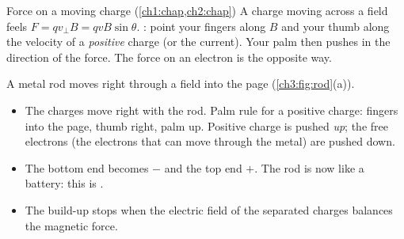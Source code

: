 \begin{keywords}
\end{keywords}

\begin{refresher}{Force on a moving charge (\cref{ch1:chap,ch2:chap})}
A charge moving across a field feels $F = qv_\perp B = qvB\sin\theta$.
: point your fingers along $B$ and your thumb along
the velocity of a \emph{positive} charge (or the current). Your palm then pushes
in the direction of the force. The force on an electron is the opposite way.
\end{refresher}

A metal rod moves right through a field into the page (\cref{ch3:fig:rod}(a)).
\begin{itemize}
  \item The charges move right with the rod. Palm rule for a positive charge:
        fingers into the page, thumb right, palm up. Positive charge is pushed
        \emph{up}; the free electrons (the electrons that can move through the
        metal) are pushed down.
  \item The bottom end becomes $-$ and the top end $+$. The rod is now like a
        battery: this is .
  \item The build-up stops when the electric field of the separated charges
        balances the magnetic force.
\end{itemize}


